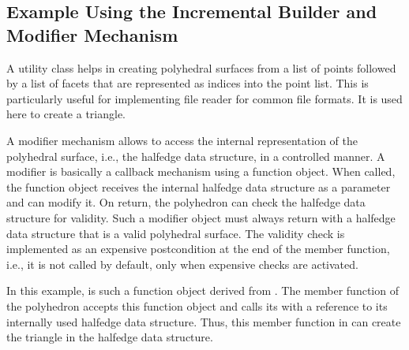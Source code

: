 
\subsection{Example Using the Incremental Builder and Modifier Mechanism}

A utility class  helps in
creating polyhedral surfaces from a list of points followed by a list
of facets that are represented as indices into the point list. This is
particularly useful for implementing file reader for common file
formats.  It is used here to create a triangle.

A modifier mechanism allows to access the internal representation of
the polyhedral surface, i.e., the halfedge data structure, in a
controlled manner. A modifier is basically a callback mechanism using
a function object. When called, the function object receives the
internal halfedge data structure as a parameter and can modify it.  On
return, the polyhedron can check the halfedge data structure for
validity. Such a modifier object must always return with a halfedge
data structure that is a valid polyhedral surface. The validity check is
implemented as an expensive postcondition at the end of the 
member function, i.e., it is not called by default, only when expensive
checks are activated.

In this example,  is such a function object
derived from . The 
member function of the polyhedron accepts this function object and calls
its  with a reference to its internally used halfedge 
data structure. Thus, this member function in  can 
create the triangle in the halfedge data structure.






